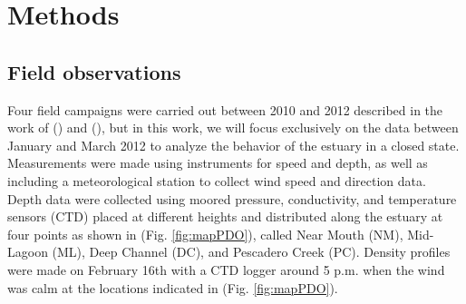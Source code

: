 \documentclass[11pt,letterpaper]{article}
\begin{document}

\section{Methods}


\subsection{Field observations}

Four field campaigns were carried out between 2010 and 2012 described in the work of \citeauthor{Williams2014} (\cite*{Williams2014}) and \citeauthor{williams2016} (\cite*{williams2016}), but in this work, we will focus exclusively on the data between January and March 2012 to analyze the behavior of the estuary in a closed state. Measurements were made using instruments for speed and depth, as well as including a meteorological station to collect wind speed and direction data. Depth data were collected using moored pressure, conductivity, and temperature sensors (CTD) placed at different heights and distributed along the estuary at four points as shown in (Fig. \ref{fig:mapPDO}), called Near Mouth (NM), Mid-Lagoon (ML), Deep Channel (DC), and Pescadero Creek (PC). Density profiles were made on February 16th with a CTD logger around 5 p.m. when the wind was calm at the locations indicated in (Fig. \ref{fig:mapPDO}).
\end{document}
